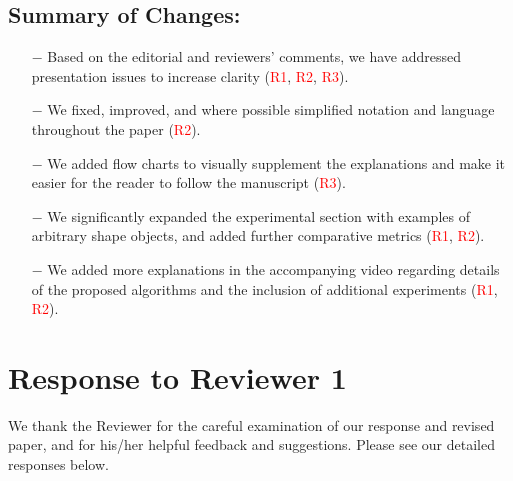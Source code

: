 \documentclass[11pt]{article}
\begin{document}
\subsection*{Summary of Changes:}
\begin{itemize}
\item[$-$] Based on the editorial and reviewers' comments, we have addressed presentation issues to increase clarity (\textcolor{red}{R1}, \textcolor{red}{R2}, \textcolor{red}{R3}). 
\item[$-$] We fixed, improved, and where possible simplified notation and language throughout the paper (\textcolor{red}{R2}).
\item[$-$] We added flow charts to visually supplement the explanations and make it easier for the reader to follow the manuscript (\textcolor{red}{R3}).
\item[$-$] We significantly expanded the experimental section with examples of arbitrary shape objects, and added further comparative metrics (\textcolor{red}{R1}, \textcolor{red}{R2}).
\item[$-$] We added more explanations in the accompanying video regarding details of the proposed algorithms and the inclusion of additional experiments (\textcolor{red}{R1}, \textcolor{red}{R2}).
\end{itemize}



 \clearpage



\section*{Response to Reviewer 1}
We thank the Reviewer for the careful examination of our response and revised paper, and for his/her helpful feedback and suggestions. Please see our detailed responses below.
\end{document}
